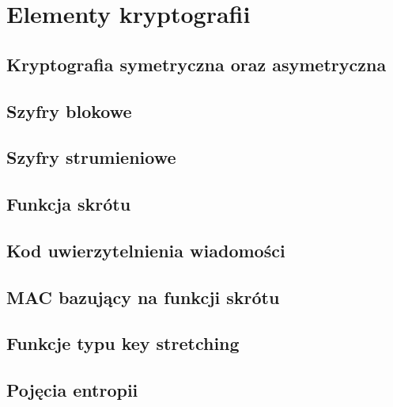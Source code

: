 \chapter{Elementy kryptografii}

\section{Kryptografia symetryczna oraz asymetryczna}
\section{Szyfry blokowe}
\section{Szyfry strumieniowe}
\section{Funkcja skrótu}
\section{Kod uwierzytelnienia wiadomości}
\section{MAC bazujący na funkcji skrótu}
\section{Funkcje typu key stretching}
\section{Pojęcia entropii}
